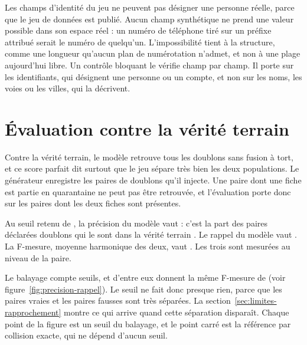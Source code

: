 Les champs d'identité du jeu ne peuvent pas désigner une personne réelle, parce que le jeu de
données est publié. Aucun champ synthétique ne prend une valeur possible dans son espace réel : un
numéro de téléphone tiré sur un préfixe attribué serait le numéro de quelqu'un. L'impossibilité
tient à la structure, comme une longueur qu'aucun plan de numérotation n'admet, et non à une plage
aujourd'hui libre. Un contrôle bloquant le vérifie champ par champ. Il porte sur les identifiants,
qui désignent une personne ou un compte, et non sur les noms, les voies ou les villes, qui la
décrivent.

\section{Évaluation contre la vérité terrain}

Contre la vérité terrain, le modèle retrouve tous les doublons sans fusion à tort, et ce score
parfait dit surtout que le jeu sépare très bien les deux populations. Le générateur enregistre les
 paires de doublons qu'il injecte. Une paire dont une fiche est partie
en quarantaine ne peut pas être retrouvée, et l'évaluation porte donc sur les
 paires dont les deux fiches sont présentes.

Au seuil retenu de , la précision du modèle vaut
 : c'est la part des paires déclarées doublons qui le sont dans la
vérité terrain \cite{s51}. Le rappel du modèle vaut . La F-mesure,
moyenne harmonique des deux, vaut  \cite{s51}. Les trois sont
mesurées au niveau de la paire.

Le balayage compte  seuils, et  d'entre
eux donnent la même F-mesure de  (voir
figure~\ref{fig:precision-rappel}). Le seuil ne fait donc presque rien, parce que les paires vraies
et les paires fausses sont très séparées. La section~\ref{sec:limites-rapprochement} montre ce qui
arrive quand cette séparation disparaît. Chaque point de la figure est un seuil du balayage, et le
point carré est la référence par collision exacte, qui ne dépend d'aucun seuil.

